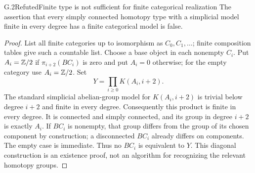 \begin{claim}{G.2}{Refuted}{Finite type is not sufficient for finite categorical realization}
The assertion that every simply connected homotopy type with a simplicial model finite in every degree has a finite categorical model is false.
\end{claim}
\begin{proof}
List all finite categories up to isomorphism as $C_0,C_1,\ldots$; finite composition tables give such a countable list. Choose a base object in each nonempty $C_i$. Put $A_i=\mathbb Z/2$ if $\pi_{i+2}(BC_i)$ is zero and put $A_i=0$ otherwise; for the empty category use $A_i=\mathbb Z/2$. Set
\[
                 Y=\prod_{i\geq0}K(A_i,i+2).
\]
The standard simplicial abelian-group model for $K(A_i,i+2)$ is trivial below degree $i+2$ and finite in every degree. Consequently this product is finite in every degree. It is connected and simply connected, and its group in degree $i+2$ is exactly $A_i$. If $BC_i$ is nonempty, that group differs from the group of its chosen component by construction; a disconnected $BC_i$ already differs on components. The empty case is immediate. Thus no $BC_i$ is equivalent to $Y$. This diagonal construction is an existence proof, not an algorithm for recognizing the relevant homotopy groups.
\end{proof}

